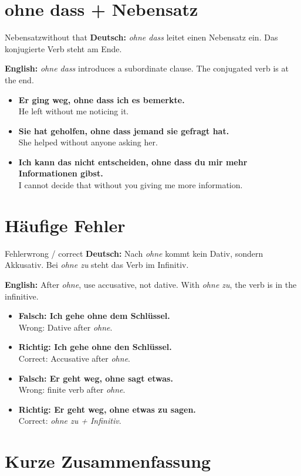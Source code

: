 \documentclass[a4paper,11pt]{article}
\newcommand{\GermanText}[1]{\textbf{Deutsch: }#1\par}
\newcommand{\EnglishText}[1]{{\small\color{SoftGray}\textbf{English: }#1\par}}
\newcommand{\ExampleItem}[2]{\item \textbf{#1}\\{\small\color{SoftGray}#2}}
\begin{document}
\section{ohne dass + Nebensatz}

\begin{grammarentry}{Nebensatz}{without that}
\GermanText{\textit{ohne dass} leitet einen Nebensatz ein. Das konjugierte Verb steht am Ende.}
\EnglishText{\textit{ohne dass} introduces a subordinate clause. The conjugated verb is at the end.}

\begin{exbox}
\begin{itemize}
    \ExampleItem{Er ging weg, ohne dass ich es bemerkte.}{He left without me noticing it.}
    \ExampleItem{Sie hat geholfen, ohne dass jemand sie gefragt hat.}{She helped without anyone asking her.}
    \ExampleItem{Ich kann das nicht entscheiden, ohne dass du mir mehr Informationen gibst.}{I cannot decide that without you giving me more information.}
\end{itemize}
\end{exbox}
\end{grammarentry}

\section{Häufige Fehler}

\begin{grammarentry}{Fehler}{wrong / correct}
\GermanText{Nach \textit{ohne} kommt kein Dativ, sondern Akkusativ. Bei \textit{ohne zu} steht das Verb im Infinitiv.}
\EnglishText{After \textit{ohne}, use accusative, not dative. With \textit{ohne zu}, the verb is in the infinitive.}

\begin{exbox}
\begin{itemize}
    \ExampleItem{Falsch: Ich gehe ohne dem Schlüssel.}{Wrong: Dative after \textit{ohne}.}
    \ExampleItem{Richtig: Ich gehe ohne den Schlüssel.}{Correct: Accusative after \textit{ohne}.}
    \ExampleItem{Falsch: Er geht weg, ohne sagt etwas.}{Wrong: finite verb after \textit{ohne}.}
    \ExampleItem{Richtig: Er geht weg, ohne etwas zu sagen.}{Correct: \textit{ohne zu + Infinitiv}.}
\end{itemize}
\end{exbox}
\end{grammarentry}

\section{Kurze Zusammenfassung}
\end{document}
